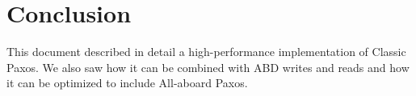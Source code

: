 \section{Conclusion}

This document described in detail a high-performance implementation of Classic Paxos. We also saw how it can be combined with ABD writes and reads and how it can be optimized to include All-aboard Paxos.